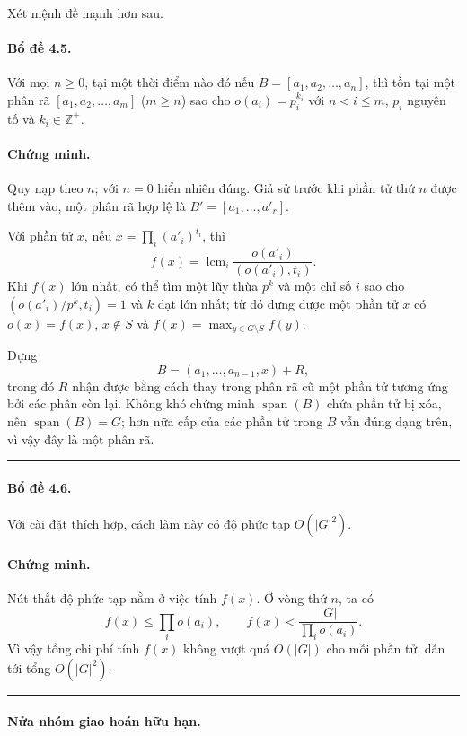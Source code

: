 \documentclass[11pt]{article}
\begin{document}
Xét mệnh đề mạnh hơn sau.

\paragraph{Bổ đề 4.5.}
Với mọi $n\ge0$, tại một thời điểm nào đó nếu
$B=[a_1,a_2,\ldots,a_n]$, thì tồn tại một phân rã
$[a_1,a_2,\ldots,a_m]$ ($m\ge n$) sao cho
$o(a_i)=p_i^{k_i}$ với $n<i\le m$, $p_i$ nguyên tố và $k_i\in\mathbb Z^+$.

\paragraph{Chứng minh.}
Quy nạp theo $n$; với $n=0$ hiển nhiên đúng. Giả sử trước khi phần tử thứ $n$
được thêm vào, một phân rã hợp lệ là
$B'=[a_1,\ldots,a'_r]$.

Với phần tử $x$, nếu $x=\prod_i (a'_i)^{t_i}$, thì
\[
  f(x)=\operatorname{lcm}_i\frac{o(a'_i)}{(o(a'_i),t_i)}.
\]
Khi $f(x)$ lớn nhất, có thể tìm một lũy thừa $p^k$ và một chỉ số $i$ sao cho
$(o(a'_i)/p^k,t_i)=1$ và $k$ đạt lớn nhất; từ đó dựng được một phần tử $x$ có
$o(x)=f(x)$, $x\notin S$ và $f(x)=\max_{y\in G\setminus S} f(y)$.

Dựng
\[
  B=(a_1,\ldots,a_{n-1},x)+R,
\]
trong đó $R$ nhận được bằng cách thay trong phân rã cũ một phần tử tương ứng bởi
các phần còn lại. Không khó chứng minh $\operatorname{span}(B)$ chứa phần tử bị
xóa, nên $\operatorname{span}(B)=G$; hơn nữa cấp của các phần tử trong $B$ vẫn
đúng dạng trên, vì vậy đây là một phân rã. \hfill\rule{0.55em}{0.55em}

\paragraph{Bổ đề 4.6.}
Với cài đặt thích hợp, cách làm này có độ phức tạp $O(|G|^2)$.

\paragraph{Chứng minh.}
Nút thắt độ phức tạp nằm ở việc tính $f(x)$. Ở vòng thứ $n$, ta có
\[
  f(x)\le\prod_i o(a_i),\qquad
  f(x)<\frac{|G|}{\prod_i o(a_i)}.
\]
Vì vậy tổng chi phí tính $f(x)$ không vượt quá $O(|G|)$ cho mỗi phần tử, dẫn
tới tổng $O(|G|^2)$. \hfill\rule{0.55em}{0.55em}

\paragraph{Nửa nhóm giao hoán hữu hạn.}
\end{document}
